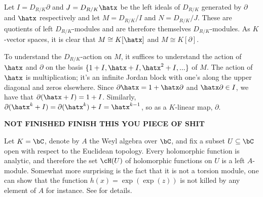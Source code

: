 \begin{example}\label{example:d-mod-quotient-by-x-and-partial}
	Let $I = D_{R/K}\partial$ and $J = D_{R/K}\hatx$ be the left ideals of $D_{R/K}$ generated by $\partial$ and $\hatx$ respectively and let $M = D_{R/K}/I$ and $N = D_{R/K}/J$. These are quotients of left $D_{R/K}$-modules and are therefore themselves $D_{R/K}$-modules. As $K$-vector spaces, it is clear that $M \cong K[\hatx]$ and $M \cong K[\partial]$.

	To understand the $D_{R/K}$-action on $M$, it suffices to understand the action of $\hatx$ and $\partial$ on the basis $\{1+I,\hatx + I,\hatx^2 + I,...\}$ of $M$. The action of $\hatx$ is multiplication; it's an infinite Jordan block with one's along the upper diagonal and zeros elsewhere. Since $\partial\hatx = 1 + \hatx\partial$ and $\hatx\partial \in I$, we have that $\partial(\hatx + I) = 1 + I$. Similarly, $\partial(\hatx^k + I) = \partial(\hatx^k) + I = \hatx^{k-1}$, so as a $K$-linear map, $\partial$.

	\textbf{NOT FINISHED FINISH THIS YOU PIECE OF SHIT}
\end{example}
\begin{example}\label{example:d-mod-holomorphic-functions}
	Let $K = \bC$, denote by $A$ the Weyl algebra over $\bC$, and fix a subset $U \subseteq \bC$ open with respect to the Euclidean topology. Every holomorphic function is analytic, and therefore the set $\cH(U)$ of holomorphic functions on $U$ is a left $A$-module. Somewhat more surprising is the fact that it is not a torsion module, one can show that the function $h(x) = \exp(\exp(z))$ is not killed by any element of $A$ for instance. See \cite[Chapter 5.3]{d-mod-primer} for details.
\end{example}
